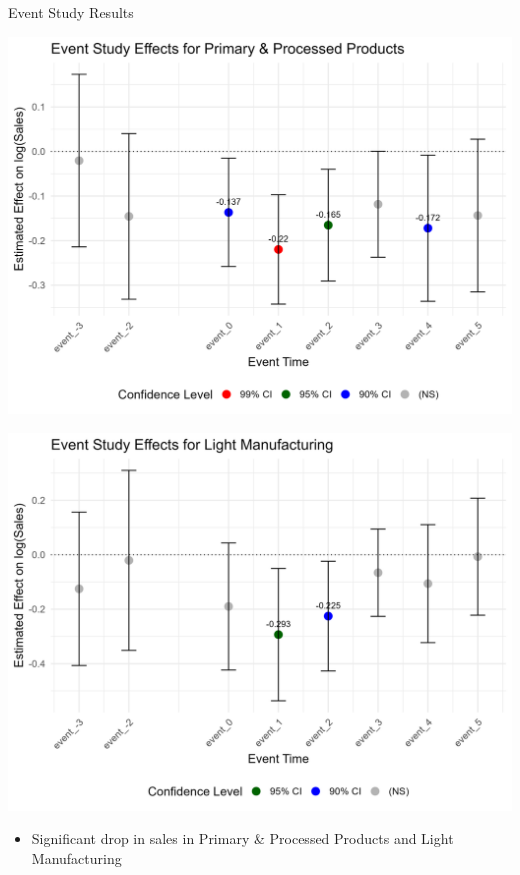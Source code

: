 \documentclass[
  xcolor=svgnames,
  bookmarks=true,
  bookmarksopen=true,
  pdfborder={0 0 0},
  pdfhighlight={/N},
  linkbordercolor={rgb}{0.5,0.5,0.5},
  implicit=false,
  colorlinks=true,
  allcolors=deepblue
]{beamer}
\begin{document}
\begin{frame}{Event Study Results}
\centering
\begin{minipage}{0.49\textwidth}
    \centering
    \includegraphics[width=\linewidth]{Results Prim.png}
\end{minipage}
\hfill
\begin{minipage}{0.49\textwidth}
    \centering
    \includegraphics[width=\linewidth]{Results Manuf.png}
\end{minipage}
\vspace{0.5cm}
\begin{itemize}
    \item Significant drop in sales in Primary \& Processed Products and Light Manufacturing

\end{itemize}
\end{frame}
\end{document}
